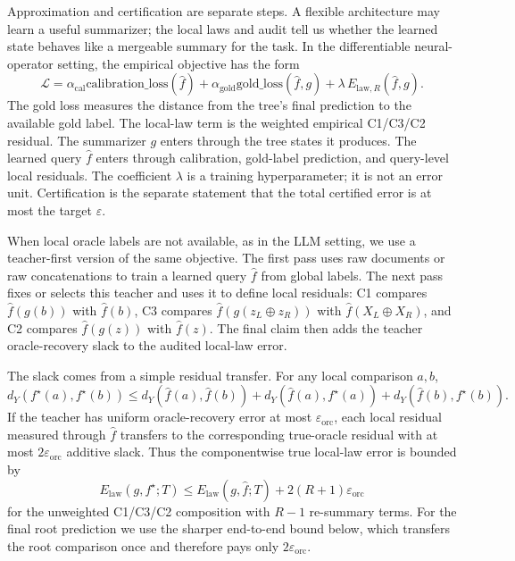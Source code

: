Approximation and certification are separate steps. A flexible
architecture may learn a useful summarizer; the local laws and audit
tell us whether the learned state behaves like a mergeable summary for
the task. In the differentiable neural-operator setting, the empirical
objective has the form
\[
  \mathcal{L}
  =
  \alpha_{\mathrm{cal}}\mathrm{calibration\_loss}(\widehat f)
  +\alpha_{\mathrm{gold}}\mathrm{gold\_loss}(\widehat f,g)
  +\lambda\,E_{\mathrm{law},R}(\widehat f,g).
\]
The gold loss measures the distance from the tree's final prediction
to the available gold label. The local-law term is the weighted
empirical C1/C3/C2 residual. The summarizer \(g\) enters through the
tree states it produces. The learned query \(\widehat f\) enters through
calibration, gold-label prediction, and query-level local residuals.
The coefficient \(\lambda\) is a training hyperparameter; it is not an
error unit. Certification is the separate statement that the total
certified error is at most the target \(\varepsilon\).

When local oracle labels are not available, as in the LLM setting, we
use a teacher-first version of the same objective. The first pass uses
raw documents or raw concatenations to train a learned query
\(\widehat f\) from global labels. The next pass fixes or selects this
teacher and uses it to define local residuals: C1 compares
\(\widehat f(g(b))\) with \(\widehat f(b)\), C3 compares
\(\widehat f(g(z_L\oplus z_R))\) with
\(\widehat f(X_L\oplus X_R)\), and C2 compares
  \(\widehat f(g(z))\) with \(\widehat f(z)\). The final claim then
  adds the teacher oracle-recovery slack to the audited local-law error.

The slack comes from a simple residual transfer. For any local
comparison \(a,b\),
\[
  d_Y(f^\star(a),f^\star(b))
  \le
  d_Y(\widehat f(a),\widehat f(b))
  +d_Y(\widehat f(a),f^\star(a))
  +d_Y(\widehat f(b),f^\star(b)).
\]
If the teacher has uniform oracle-recovery error at most
\(\varepsilon_{\mathrm{orc}}\), each
local residual measured through \(\widehat f\) transfers to the
corresponding true-oracle residual with at most
\(2\varepsilon_{\mathrm{orc}}\)
additive slack. Thus the componentwise true local-law error is bounded by
\[
  E_{\mathrm{law}}(g,f^\star;T)
  \le
  E_{\mathrm{law}}(g,\widehat f;T)+2(R+1)\varepsilon_{\mathrm{orc}}
\]
for the unweighted C1/C3/C2 composition with \(R-1\) re-summary
terms. For the final root prediction we use the sharper end-to-end
bound below, which transfers the root comparison once and therefore
pays only \(2\varepsilon_{\mathrm{orc}}\).


